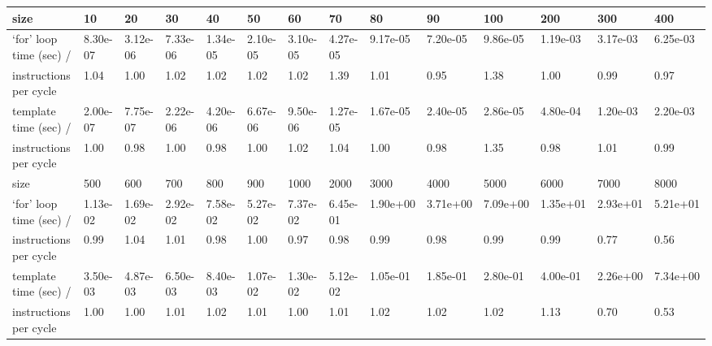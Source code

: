 \documentclass[a4paper,11pt]{article}
\begin{document}
\begin{tabular}{|l|l|l|l|l|l|l|l|l|l|l|l|l|l|}
\hline
size & 10 & 20 & 30 & 40 & 50 & 60 & 70 & 80 & 90 & 100 & 200 & 300 & 400 \\
\hline
`for' loop time (sec) / & 8.30e-07 & 3.12e-06 & 7.33e-06 & 1.34e-05 & 2.10e-05 & 3.10e-05 & 4.27e-05 & 9.17e-05 & 7.20e-05 & 9.86e-05 & 1.19e-03 & 3.17e-03 & 6.25e-03 \\
instructions per cycle & 1.04 & 1.00 & 1.02 & 1.02 & 1.02 & 1.02 & 1.39 & 1.01 & 0.95 & 1.38 & 1.00 & 0.99 & 0.97 \\
\hline
template time (sec) / & 2.00e-07 & 7.75e-07 & 2.22e-06 & 4.20e-06 & 6.67e-06 & 9.50e-06 & 1.27e-05 & 1.67e-05 & 2.40e-05 & 2.86e-05 & 4.80e-04 & 1.20e-03 & 2.20e-03 \\
instructions per cycle & 1.00 & 0.98 & 1.00 & 0.98 & 1.00 & 1.02 & 1.04 & 1.00 & 0.98 & 1.35 & 0.98 & 1.01 & 0.99 \\ 
\hline
\hline
size & 500 & 600 & 700 & 800 & 900 & 1000 & 2000 & 3000 & 4000 & 5000 & 6000 & 7000 & 8000\\
\hline
`for' loop time (sec) / & 1.13e-02 & 1.69e-02 & 2.92e-02 & 7.58e-02 & 5.27e-02 & 7.37e-02 & 6.45e-01 & 1.90e+00 & 3.71e+00 & 7.09e+00 & 1.35e+01 & 2.93e+01 & 5.21e+01\\
instructions per cycle & 0.99 & 1.04 & 1.01 & 0.98 & 1.00 & 0.97 & 0.98 & 0.99 & 0.98 & 0.99 & 0.99 & 0.77 & 0.56\\
\hline
template time (sec) / & 3.50e-03 & 4.87e-03 & 6.50e-03 & 8.40e-03 & 1.07e-02 & 1.30e-02 & 5.12e-02 & 1.05e-01 & 1.85e-01 & 2.80e-01 & 4.00e-01 & 2.26e+00 & 7.34e+00\\
instructions per cycle & 1.00 & 1.00 & 1.01 & 1.02 & 1.01 & 1.00 & 1.01 & 1.02 & 1.02 & 1.02 & 1.13 & 0.70 & 0.53\\
\hline
\end{tabular}
\end{document}
